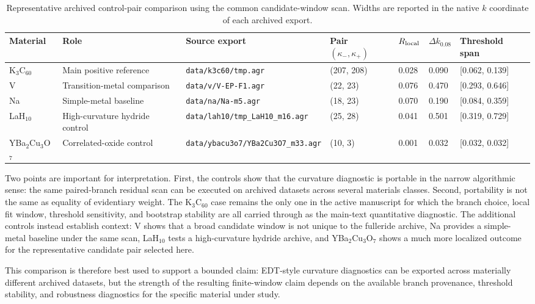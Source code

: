 \begin{table}[t]
\centering
\caption{Representative archived control-pair comparison using the common candidate-window scan. Widths are reported in the native $k$ coordinate of each archived export.}
\begin{tabular}{lllllll}
\hline
Material & Role & Source export & Pair $(\kappa_-,\kappa_+)$ & $R_{\rm local}$ & $\Delta k_{0.08}$ & Threshold span \\
\hline
K$_3$C$_{60}$ & Main positive reference & \texttt{data/k3c60/tmp.agr} & (207, 208) & 0.028 & 0.090 & [0.062, 0.139] \\
V & Transition-metal comparison & \texttt{data/v/V-EP-F1.agr} & (22, 23) & 0.076 & 0.470 & [0.293, 0.646] \\
Na & Simple-metal baseline & \texttt{data/na/Na-m5.agr} & (18, 23) & 0.070 & 0.190 & [0.084, 0.359] \\
LaH$_{10}$ & High-curvature hydride control & \texttt{data/lah10/tmp\_LaH10\_m16.agr} & (25, 28) & 0.041 & 0.501 & [0.319, 0.729] \\
YBa$_2$Cu$_3$O$_7$ & Correlated-oxide control & \texttt{data/ybacu3o7/YBa2Cu3O7\_m33.agr} & (10, 3) & 0.001 & 0.032 & [0.032, 0.032] \\
\hline
\end{tabular}
\label{tab:s4_material_controls}
\end{table}

Two points are important for interpretation. First, the controls show that the curvature diagnostic is portable in the narrow algorithmic sense: the same paired-branch residual scan can be executed on archived datasets across several materials classes. Second, portability is not the same as equality of evidentiary weight. The K$_3$C$_{60}$ case remains the only one in the active manuscript for which the branch choice, local fit window, threshold sensitivity, and bootstrap stability are all carried through as the main-text quantitative diagnostic. The additional controls instead establish context: V shows that a broad candidate window is not unique to the fulleride archive, Na provides a simple-metal baseline under the same scan, LaH$_{10}$ tests a high-curvature hydride archive, and YBa$_2$Cu$_3$O$_7$ shows a much more localized outcome for the representative candidate pair selected here.

This comparison is therefore best used to support a bounded claim: EDT-style curvature diagnostics can be exported across materially different archived datasets, but the strength of the resulting finite-window claim depends on the available branch provenance, threshold stability, and robustness diagnostics for the specific material under study.
